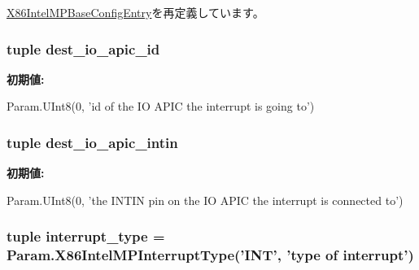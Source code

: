 \hyperlink{classIntelMP_1_1X86IntelMPBaseConfigEntry_a17da7064bc5c518791f0c891eff05fda}{X86IntelMPBaseConfigEntry}を再定義しています。\hypertarget{classIntelMP_1_1X86IntelMPIOIntAssignment_aead66195c6e1a64083478fe93c6ce25b}{
\subsubsection[{dest\_\-io\_\-apic\_\-id}]{\setlength{\rightskip}{0pt plus 5cm}tuple {\bf dest\_\-io\_\-apic\_\-id}}}
\label{classIntelMP_1_1X86IntelMPIOIntAssignment_aead66195c6e1a64083478fe93c6ce25b}
{\bfseries 初期値:}
\begin{DoxyCode}
Param.UInt8(0,
            'id of the IO APIC the interrupt is going to')
\end{DoxyCode}
\hypertarget{classIntelMP_1_1X86IntelMPIOIntAssignment_a1f5e6706032c21ac7793eb365e4e7ade}{
\subsubsection[{dest\_\-io\_\-apic\_\-intin}]{\setlength{\rightskip}{0pt plus 5cm}tuple {\bf dest\_\-io\_\-apic\_\-intin}}}
\label{classIntelMP_1_1X86IntelMPIOIntAssignment_a1f5e6706032c21ac7793eb365e4e7ade}
{\bfseries 初期値:}
\begin{DoxyCode}
Param.UInt8(0,
            'the INTIN pin on the IO APIC the interrupt is connected to')
\end{DoxyCode}
\hypertarget{classIntelMP_1_1X86IntelMPIOIntAssignment_a47ced18ebb7927f6eede388751a1e331}{
\subsubsection[{interrupt\_\-type}]{\setlength{\rightskip}{0pt plus 5cm}tuple {\bf interrupt\_\-type} = Param.X86IntelMPInterruptType('INT', '{\bf type} of interrupt')}}
